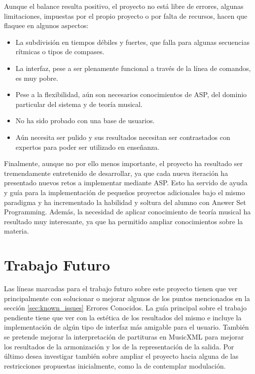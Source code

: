 Aunque el balance resulta positivo, el proyecto no está libre de errores, algunas limitaciones, impuestas por el propio proyecto o por falta de recursos, hacen que flaquee en algunos aspectos:
\begin{itemize}
	\item La subdivisión en tiempos débiles y fuertes, que falla para algunas secuencias rítmicas o tipos de compases.
	\item La interfaz, pese a ser plenamente funcional a través de la línea de comandos, es muy pobre.
	\item Pese a la flexibilidad, aún son necesarios conocimientos de ASP, del dominio particular del sistema y de teoría musical.
	\item No ha sido probado con una base de usuarios.
	\item Aún necesita ser pulido y sus resultados necesitan ser contrastados con expertos para poder ser utilizado en enseñanza.
\end{itemize} 

Finalmente, aunque no por ello menos importante, el proyecto ha resultado ser tremendamente entretenido de desarrollar, ya que cada nueva iteración ha presentado nuevos retos a implementar mediante ASP. Esto ha servido de ayuda y guía para la implementación de pequeños proyectos adicionales bajo el mismo paradigma y ha incrementado la habilidad y soltura del alumno con Answer Set Programming. Además, la necesidad de aplicar conocimiento de teoría musical ha resultado muy interesante, ya que ha permitido ampliar conocimientos sobre la materia.
 
\section{Trabajo Futuro}
\label{sec:future_work}
Las líneas marcadas para el trabajo futuro sobre este proyecto tienen que ver principalmente con solucionar o mejorar algunos de los puntos mencionados en la sección \ref{sec:known_issues} Errores Conocidos. La guía principal sobre el trabajo pendiente tiene que ver con la estética de los resultados del mismo e incluye la implementación de algún tipo de interfaz más amigable para el usuario. También se pretende mejorar la interpretación de partituras en MusicXML para mejorar los resultados de la armonización y los de la representación de la salida. Por último desea investigar también sobre ampliar el proyecto hacia alguna de las restricciones propuestas inicialmente, como la de contemplar modulación.

